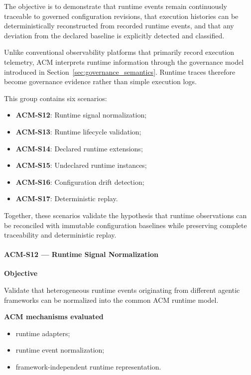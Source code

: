 \documentclass[10pt]{article}
\begin{document}
The objective is to demonstrate that runtime events remain continuously
traceable to governed configuration revisions, that execution histories can be
deterministically reconstructed from recorded runtime events, and that any
deviation from the declared baseline is explicitly detected and classified.

Unlike conventional observability platforms that primarily record execution
telemetry, ACM interprets runtime information through the governance model
introduced in Section~\ref{sec:governance_semantics}. Runtime traces therefore
become governance evidence rather than simple execution logs.

This group contains six scenarios:

\begin{itemize}
    \item \textbf{ACM-S12}: Runtime signal normalization;
    \item \textbf{ACM-S13}: Runtime lifecycle validation;
    \item \textbf{ACM-S14}: Declared runtime extensions;
    \item \textbf{ACM-S15}: Undeclared runtime instances;
    \item \textbf{ACM-S16}: Configuration drift detection;
    \item \textbf{ACM-S17}: Deterministic replay.
\end{itemize}

Together, these scenarios validate the hypothesis that runtime observations can
be reconciled with immutable configuration baselines while preserving complete
traceability and deterministic replay.

\paragraph{ACM-S12 --- Runtime Signal Normalization}

\textbf{Objective}

Validate that heterogeneous runtime events originating from different agentic
frameworks can be normalized into the common ACM runtime model.

\textbf{ACM mechanisms evaluated}

\begin{itemize}
    \item runtime adapters;
    \item runtime event normalization;
    \item framework-independent runtime representation.
\end{itemize}
\end{document}
